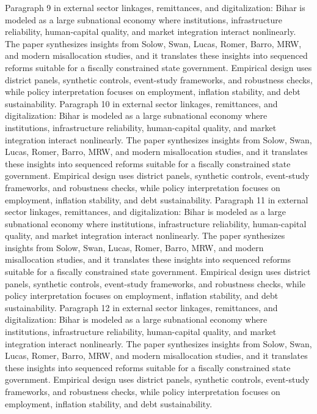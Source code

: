 \documentclass[preprint,12pt]{elsarticle}
\begin{document}
Paragraph 9 in external sector linkages, remittances, and digitalization: Bihar is modeled as a large subnational economy where institutions, infrastructure reliability, human-capital quality, and market integration interact nonlinearly. The paper synthesizes insights from Solow, Swan, Lucas, Romer, Barro, MRW, and modern misallocation studies, and it translates these insights into sequenced reforms suitable for a fiscally constrained state government. Empirical design uses district panels, synthetic controls, event-study frameworks, and robustness checks, while policy interpretation focuses on employment, inflation stability, and debt sustainability.
Paragraph 10 in external sector linkages, remittances, and digitalization: Bihar is modeled as a large subnational economy where institutions, infrastructure reliability, human-capital quality, and market integration interact nonlinearly. The paper synthesizes insights from Solow, Swan, Lucas, Romer, Barro, MRW, and modern misallocation studies, and it translates these insights into sequenced reforms suitable for a fiscally constrained state government. Empirical design uses district panels, synthetic controls, event-study frameworks, and robustness checks, while policy interpretation focuses on employment, inflation stability, and debt sustainability.
Paragraph 11 in external sector linkages, remittances, and digitalization: Bihar is modeled as a large subnational economy where institutions, infrastructure reliability, human-capital quality, and market integration interact nonlinearly. The paper synthesizes insights from Solow, Swan, Lucas, Romer, Barro, MRW, and modern misallocation studies, and it translates these insights into sequenced reforms suitable for a fiscally constrained state government. Empirical design uses district panels, synthetic controls, event-study frameworks, and robustness checks, while policy interpretation focuses on employment, inflation stability, and debt sustainability.
Paragraph 12 in external sector linkages, remittances, and digitalization: Bihar is modeled as a large subnational economy where institutions, infrastructure reliability, human-capital quality, and market integration interact nonlinearly. The paper synthesizes insights from Solow, Swan, Lucas, Romer, Barro, MRW, and modern misallocation studies, and it translates these insights into sequenced reforms suitable for a fiscally constrained state government. Empirical design uses district panels, synthetic controls, event-study frameworks, and robustness checks, while policy interpretation focuses on employment, inflation stability, and debt sustainability.
\end{document}
